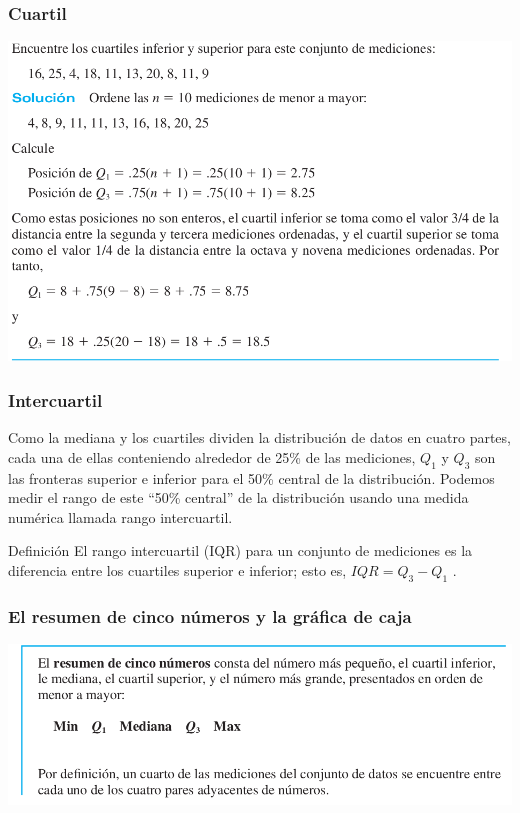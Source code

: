 \documentclass[spanish]{beamer}
\begin{document}
\begin{frame}
\frametitle{Cuartil}

\begin{center}
\includegraphics[width=\textwidth]{im28}
\end{center}


\end{frame}
\begin{frame}
\frametitle{Intercuartil}
Como la mediana y los cuartiles dividen la distribución de datos en cuatro partes, cada una de ellas conteniendo alrededor de 25\% de las mediciones, $Q_1$ y $Q_3$ son las fronteras superior e inferior para el 50\% central de la distribución. Podemos medir el rango de este “50\% central” de la distribución usando una medida numérica llamada rango intercuartil.

\begin{block}{Definición}
El rango intercuartil (IQR) para un conjunto de mediciones es la diferencia entre los cuartiles superior e inferior; esto es, $IQR = Q_3 - Q_1$ .
\end{block}
\end{frame}
\begin{frame}
\frametitle{El resumen de cinco números y la gráfica de caja}


\begin{center}
\includegraphics[width=\textwidth]{im29}
\end{center}

\end{frame}
\end{document}
